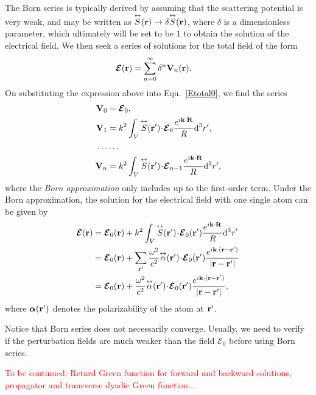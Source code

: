 The Born series is typically derived by assuming that the scattering potential is very
weak, and may be written as $ \overset{\leftrightarrow}{S}(\mathbf{r})\rightarrow \delta \overset{\leftrightarrow}{S}(\mathbf{r}) $, where $ \delta $ is a dimensionless parameter, which ultimately will be set to be $ 1 $ to obtain the solution of the electrical field. We then seek a series of solutions for the total field of the form
\begin{align}
\boldsymbol{\mathcal{E}}(\mathbf{r}) &= \sum_{n=0}^{\infty} \delta^n \mathbf{V}_n(\mathbf{r}).
\end{align}
On substituting the expression above into Equ.~\ref{Etotal0}, we find the series
\begin{align}
\mathbf{V}_0 &= \boldsymbol{\mathcal{E}}_0,\\
\mathbf{V}_1 &= k^2\int_V \overset{\leftrightarrow}{S}(\mathbf{r}')\! \cdot\! \boldsymbol{\mathcal{E}}_0 \frac{e^{i\mathbf{k}\cdot \mathbf{R}}}{R} \mathrm{d}^3 r',\\
\ldots & \ldots\\
\mathbf{V}_n &= k^2\int_V \overset{\leftrightarrow}{S}(\mathbf{r}') \! \cdot\!\boldsymbol{\mathcal{E}}_{n-1} \frac{e^{i\mathbf{k}\cdot \mathbf{R}}}{R} \mathrm{d}^3 r',
\end{align}
where the \textit{Born approximation} only includes up to the first-order term. Under the Born approximation, the solution for the electrical field with one single atom can be given by
\begin{align}
\boldsymbol{\mathcal{E}} (\mathbf{r}) &= \boldsymbol{\mathcal{E}}_0 (\mathbf{r}) + k^2\int_V \overset{\leftrightarrow}{S}(\mathbf{r}')\! \cdot\! \boldsymbol{\mathcal{E}}_0 (\mathbf{r}') \frac{e^{i\mathbf{k}\cdot \mathbf{R}}}{R} \mathrm{d}^3 r'\\
&= \boldsymbol{\mathcal{E}}_0(\mathbf{r}) +\sum_{\mathbf{r}'}\frac{\omega^2}{c^2} \overset{\leftrightarrow}{\alpha}(\mathbf{r}') \! \cdot\!\boldsymbol{\mathcal{E}}_0 (\mathbf{r}')\frac{e^{i\mathbf{k}\cdot (\mathbf{r}-\mathbf{r}')}}{|\mathbf{r}-\mathbf{r}'|}\\
&=\boldsymbol{\mathcal{E}}_0(\mathbf{r}) + \frac{\omega^2}{c^2} \overset{\leftrightarrow}{\alpha}(\mathbf{r}')\! \cdot\! \boldsymbol{\mathcal{E}}_0 (\mathbf{r}')\frac{e^{i\mathbf{k}\cdot (\mathbf{r}-\mathbf{r}')}}{|\mathbf{r}-\mathbf{r}'|},
\end{align}
where $ \boldsymbol{\alpha}(\mathbf{r}') $ denotes the polarizability of the atom at $ \mathbf{r}' $. 

Notice that Born series does not necessarily converge. Usually, we need to verify if the perturbation fields are much weaker than the field $ \boldsymbol{\mathcal{E}}_0 $ before using Born series. 

\textcolor{red}{To be continued: Retard Green function for forward and backward solutions, propagator and transverse dyadic Green function...}

